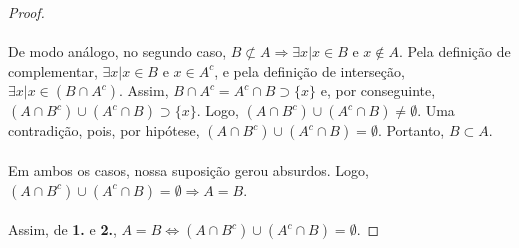 \documentclass[9pt,twocolumn,a4paper]{article}
\begin{document}
\begin{proof}
    \paragraph{}
    De modo análogo, no segundo caso, $B \not\subset A \Rightarrow \exists x | x \in B$ e $x \not\in A$. Pela definição de complementar, $\exists x | x \in B$ e $x \in A^c$, e pela definição de interseção, $\exists x | x \in (B \cap A^c)$. Assim, $B \cap A^c = A^c \cap B \supset \{x\}$ e, por conseguinte, $(A \cap B^c) \cup (A^c \cap B) \supset \{x\}$. Logo, $(A \cap B^c) \cup (A^c \cap B) \not= \emptyset$. Uma contradição, pois, por hipótese, $(A \cap B^c) \cup (A^c \cap B) = \emptyset$. Portanto, $B \subset A$.

    \paragraph{}
    Em ambos os casos, nossa suposição gerou absurdos. Logo, $(A \cap B^c) \cup (A^c \cap B) = \emptyset \Rightarrow A = B$.

    \paragraph{}
    Assim, de \textbf{1.} e \textbf{2.}, $A = B \Leftrightarrow (A \cap B^c) \cup (A^c \cap B) = \emptyset$.

    \end{proof}
\end{document}

